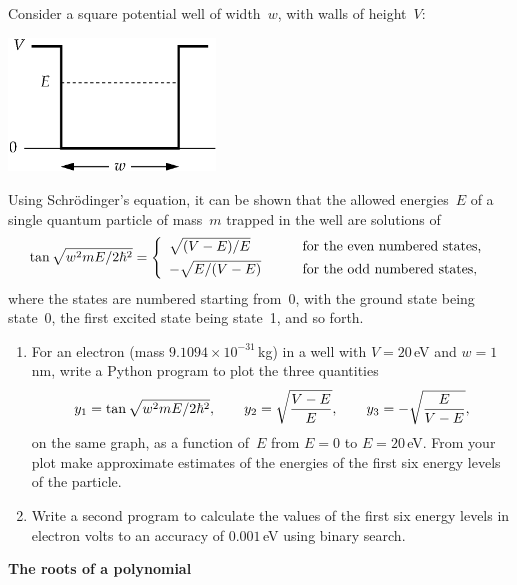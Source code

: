 \documentclass[12pt]{article}
\begin{document}
\begin{exercises}
\exercise Consider a square potential well of width~$w$, with walls
of height~$V$:
\smallskip
\begin{center}
\includegraphics[width=5.5cm]{smallwell.eps}
\end{center}
Using Schr\"odinger's equation, it can be shown that the allowed
energies~$E$ of a single quantum particle of mass~$m$ trapped in the well
are solutions of
\begin{displaymath}
\tan \sqrt{w^2mE/2\hbar^2} = \left\lbrace\begin{array}{ll}
  \sqrt{(V-E)/E} & \qquad\mbox{for the even numbered states,} \\
  - \sqrt{E/(V-E)}\pmstrut & \qquad\mbox{for the odd numbered states,}
\end{array}\right.
\end{displaymath}
where the states are numbered starting from~0, with the ground state being
state~0, the first excited state being state~1, and so forth.
\begin{enumerate}\setlength{\itemsep}{0pt}
\item For an electron (mass $9.1094\times10^{-31}\,$kg) in a well with $V =
  20\,$eV and $w = 1\,$nm, write a Python program to plot the three
  quantities
\begin{displaymath}
y_1 = \tan \sqrt{w^2mE/2\hbar^2},\qquad
y_2 = \sqrt{V-E\over E},\qquad
y_3 = -\sqrt{E\over V-E},
\end{displaymath}
on the same graph, as a function of~$E$ from $E=0$ to $E=20\,$eV.  From
your plot make approximate estimates of the energies of the first six
energy levels of the particle.
\item Write a second program to calculate the values of the first six
  energy levels in electron volts to an accuracy of $0.001\,$eV using
  binary search.
\end{enumerate}



\exercise \textbf{The roots of a polynomial}


\end{exercises}
\end{document}
